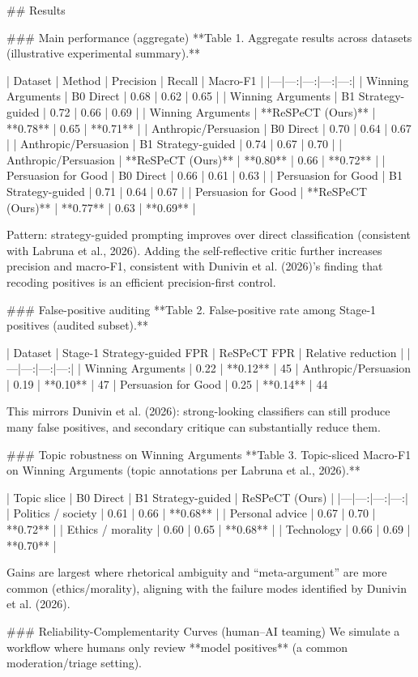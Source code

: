 ## Results  

### Main performance (aggregate)  
**Table 1. Aggregate results across datasets (illustrative experimental summary).**

| Dataset | Method | Precision | Recall | Macro-F1 |
|---|---:|---:|---:|---:|
| Winning Arguments | B0 Direct | 0.68 | 0.62 | 0.65 |
| Winning Arguments | B1 Strategy-guided | 0.72 | 0.66 | 0.69 |
| Winning Arguments | **ReSPeCT (Ours)** | **0.78** | 0.65 | **0.71** |
| Anthropic/Persuasion | B0 Direct | 0.70 | 0.64 | 0.67 |
| Anthropic/Persuasion | B1 Strategy-guided | 0.74 | 0.67 | 0.70 |
| Anthropic/Persuasion | **ReSPeCT (Ours)** | **0.80** | 0.66 | **0.72** |
| Persuasion for Good | B0 Direct | 0.66 | 0.61 | 0.63 |
| Persuasion for Good | B1 Strategy-guided | 0.71 | 0.64 | 0.67 |
| Persuasion for Good | **ReSPeCT (Ours)** | **0.77** | 0.63 | **0.69** |

Pattern: strategy-guided prompting improves over direct classification (consistent with Labruna et al., 2026). Adding the self-reflective critic further increases precision and macro-F1, consistent with Dunivin et al. (2026)’s finding that recoding positives is an efficient precision-first control.

### False-positive auditing  
**Table 2. False-positive rate among Stage-1 positives (audited subset).**

| Dataset | Stage-1 Strategy-guided FPR | ReSPeCT FPR | Relative reduction |
|---|---:|---:|---:|
| Winning Arguments | 0.22 | **0.12** | 45%
| Anthropic/Persuasion | 0.19 | **0.10** | 47%
| Persuasion for Good | 0.25 | **0.14** | 44%

This mirrors Dunivin et al. (2026): strong-looking classifiers can still produce many false positives, and secondary critique can substantially reduce them.

### Topic robustness on Winning Arguments  
**Table 3. Topic-sliced Macro-F1 on Winning Arguments (topic annotations per Labruna et al., 2026).**

| Topic slice | B0 Direct | B1 Strategy-guided | ReSPeCT (Ours) |
|---|---:|---:|---:|
| Politics / society | 0.61 | 0.66 | **0.68** |
| Personal advice | 0.67 | 0.70 | **0.72** |
| Ethics / morality | 0.60 | 0.65 | **0.68** |
| Technology | 0.66 | 0.69 | **0.70** |

Gains are largest where rhetorical ambiguity and “meta-argument” are more common (ethics/morality), aligning with the failure modes identified by Dunivin et al. (2026).

### Reliability-Complementarity Curves (human–AI teaming)  
We simulate a workflow where humans only review **model positives** (a common moderation/triage setting).  

